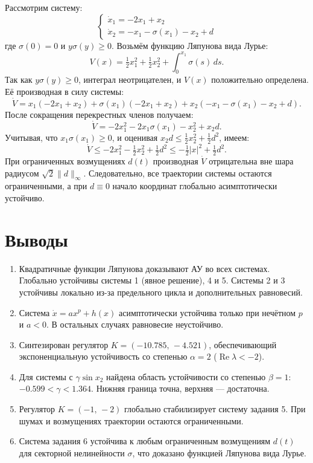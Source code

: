 \documentclass[12pt,a4paper]{article}
\begin{document}
Рассмотрим систему:
\[
\begin{cases} 
	\dot x_1 = -2x_1 + x_2 \\ 
	\dot x_2 = -x_1 - \sigma(x_1) - x_2 + d 
\end{cases}
\]
где $\sigma(0)=0$ и $y\sigma(y)\ge0$. Возьмём функцию Ляпунова вида Лурье:
\[
V(x) = \tfrac{1}{2}x_1^2 + \tfrac{1}{2}x_2^2 + \int_0^{x_1}\sigma(s)\,ds.
\]
Так как $y\sigma(y)\ge0$, интеграл неотрицателен, и $V(x)$ положительно определена. Её производная в силу системы:
\[
\dot V = x_1(-2x_1+x_2) + \sigma(x_1)(-2x_1+x_2) + x_2(-x_1-\sigma(x_1)-x_2+d).
\]
После сокращения перекрестных членов получаем:
\[
\dot V = -2x_1^2 - 2x_1\sigma(x_1) - x_2^2 + x_2d.
\]
Учитывая, что $x_1\sigma(x_1)\ge0$, и оценивая $x_2d \le \tfrac{1}{2}x_2^2 + \tfrac{1}{2}d^2$, имеем:
\[
\dot V \le -2x_1^2 - \tfrac{1}{2}x_2^2 + \tfrac{1}{2}d^2 \le -\tfrac{1}{2}|x|^2 + \tfrac{1}{2}d^2.
\]
При ограниченных возмущениях $d(t)$ производная $\dot V$ отрицательна вне шара радиусом $\sqrt{2}\|d\|_\infty$. Следовательно, все траектории системы остаются ограниченными, а при $d\equiv0$ начало координат глобально асимптотически устойчиво.

	\newpage
\section*{Выводы}
\begin{enumerate}[label=\arabic*)]
	\item Квадратичные функции Ляпунова доказывают АУ во всех системах. Глобально устойчивы системы 1 (явное решение), 4 и 5. Системы 2 и 3 устойчивы локально из-за предельного цикла и дополнительных равновесий.
	
	\item Система $\dot x=ax^p+h(x)$ асимптотически устойчива только при нечётном $p$ и $a<0$. В остальных случаях равновесие неустойчиво.
	
	\item Синтезирован регулятор $K=(-10.785,\,-4.521)$, обеспечивающий экспоненциальную устойчивость со степенью $\alpha=2$ ($\operatorname{Re}\lambda < -2$).
	
	\item Для системы с $\gamma\sin x_2$ найдена область устойчивости со степенью $\beta=1$: $-0.599<\gamma<1.364$. Нижняя граница точна, верхняя — достаточна.
	
	\item Регулятор $K=(-1,\,-2)$ глобально стабилизирует систему задания 5. При шумах и возмущениях траектории остаются ограниченными.
	
	\item Система задания 6 устойчива к любым ограниченным возмущениям $d(t)$ для секторной нелинейности $\sigma$, что доказано функцией Ляпунова вида Лурье.
\end{enumerate}
\end{document}

